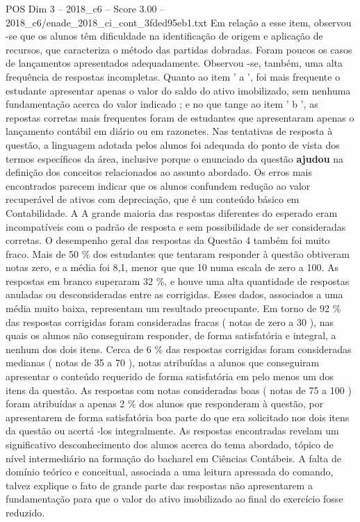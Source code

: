 \begin{textsample}{POS Dim 3 – 2018\_c6 – Score 3.00 – 2018\_c6/enade\_2018\_ci\_cont\_3fded95eb1.txt}
Em relação a esse item, observou -se que os alunos têm dificuldade na identificação de origem e aplicação de recursos, que caracteriza o método das partidas dobradas.
Foram poucos os casos de lançamentos apresentados adequadamente.
Observou -se, também, uma alta frequência de respostas incompletas.
Quanto ao item ' a ', foi mais frequente o estudante apresentar apenas o valor do saldo do ativo imobilizado, sem nenhuma fundamentação acerca do valor indicado ; e no que tange ao item ' b ', as repostas corretas mais frequentes foram de estudantes que apresentaram apenas o lançamento contábil em diário ou em razonetes.
Nas tentativas de resposta à questão, a linguagem adotada pelos alunos foi adequada do ponto de vista dos termos específicos da área, inclusive porque o enunciado da questão \textbf{ajudou} na definição dos conceitos relacionados ao assunto abordado.
Os erros mais encontrados parecem indicar que os alunos confundem redução ao valor recuperável de ativos com depreciação, que é um conteúdo básico em Contabilidade.
A A grande maioria das respostas diferentes do esperado eram incompatíveis com o padrão de resposta e sem possibilidade de ser consideradas corretas.
O desempenho geral das respostas da Questão 4 também foi muito fraco.
Mais de 50 \% dos estudantes que tentaram responder à questão obtiveram notas zero, e a média foi 8,1, menor que que 10 numa escala de zero a 100.
As respostas em branco superaram 32 \%, e houve uma alta quantidade de respostas anuladas ou desconsideradas entre as corrigidas.
Esses dados, associados a uma média muito baixa, representam um resultado preocupante.
Em torno de 92 \% das respostas corrigidas foram consideradas fracas ( notas de zero a 30 ), nas quais os alunos não conseguiram responder, de forma satisfatória e integral, a nenhum dos dois itens.
Cerca de 6 \% das respostas corrigidas foram consideradas medianas ( notas de 35 a 70 ), notas atribuídas a alunos que conseguiram apresentar o conteúdo requerido de forma satisfatória em pelo menos um dos itens da questão.
As respostas com notas consideradas boas ( notas de 75 a 100 ) foram atribuídas a apenas 2 \% dos alunos que responderam à questão, por apresentarem de forma satisfatória boa parte do que era solicitado nos dois itens da questão ou acertá -los integralmente.
As respostas encontradas revelam um significativo desconhecimento dos alunos acerca do tema abordado, tópico de nível intermediário na formação do bacharel em Ciências Contábeis.
A falta de domínio teórico e conceitual, associada a uma leitura apressada do comando, talvez explique o fato de grande parte das respostas não apresentarem a fundamentação para que o valor do ativo imobilizado ao final do exercício fosse reduzido.

\end{textsample}
